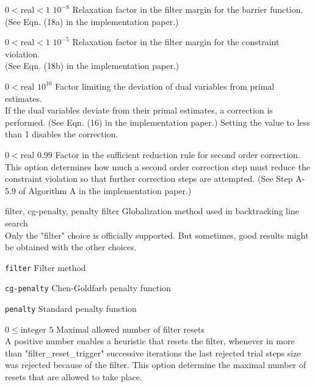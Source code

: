 %
{$0<\textrm{real}<1$}%
{$10^{- 8}$}%
{Relaxation factor in the filter margin for the barrier function.\\
(See Eqn. (18a) in the implementation paper.)}%
{}

%
{$0<\textrm{real}<1$}%
{$10^{- 5}$}%
{Relaxation factor in the filter margin for the constraint violation.\\
(See Eqn. (18b) in the implementation paper.)}%
{}

%
{$0<\textrm{real}$}%
{$10^{ 10}$}%
{Factor limiting the deviation of dual variables from primal estimates.\\
If the dual variables deviate from their primal estimates, a correction is performed. (See Eqn. (16) in the implementation paper.) Setting the value to less than 1 disables the correction.}%
{}

%
{$0<\textrm{real}$}%
{$0.99$}%
{Factor in the sufficient reduction rule for second order correction.\\
This option determines how much a second order correction step must reduce the constraint violation so that further correction steps are attempted.  (See Step A-5.9 of Algorithm A in the implementation paper.)}%
{}

%
{\ttfamily filter, cg-penalty, penalty}%
{filter}%
{Globalization method used in backtracking line search\\
Only the "filter" choice is officially supported.  But sometimes, good results might be obtained with the other choices.}%
{\begin{list}{}{
\setlength{\parsep}{0em}
\setlength{\leftmargin}{5ex}
\setlength{\labelwidth}{2ex}
\setlength{\itemindent}{0ex}
\setlength{\topsep}{0pt}}
\item[\texttt{filter}] Filter method
\item[\texttt{cg-penalty}] Chen-Goldfarb penalty function
\item[\texttt{penalty}] Standard penalty function
\end{list}
}

%
{$0\leq\textrm{integer}$}%
{$5$}%
{Maximal allowed number of filter resets\\
A positive number enables a heuristic that resets the filter, whenever in more than "filter\_reset\_trigger" successive iterations the last rejected trial steps size was rejected because of the filter.  This option determine the maximal number of resets that are allowed to take place.}%
{}

